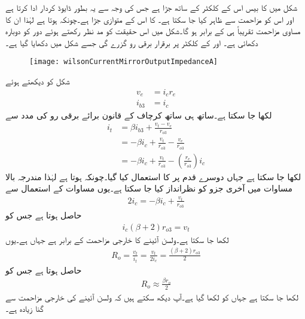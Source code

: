 شکل  میں  کا بیس اس کے کلکٹر کے ساتھ جڑا ہے جس  کی وجہ سے یہ بطور ڈایوڈ کردار ادا کرتا ہے اور اس کو مزاحمت  سے ظاہر کیا جا سکتا ہے۔ کا  اس  کے متوازی جڑا ہے۔چونکہ  ہوتا ہے لہٰذا ان کا مساوی مزاحمت تقریباً  ہی کے برابر ہو گا۔شکل  میں اس حقیقت کو مد نظر رکھتے ہوئے دور کو دوبارہ دکھائی ہے۔ اور  کے کلکٹر پر برقرار  برقی رو گزرے گی جسے شکل میں دکھایا گیا ہے۔
\begin{figure}
\centering
\texttt{[image: wilsonCurrentMirrorOutputImpedanceA]}
\caption{}
\label{شکل_تفرقی_ولسن_آئینے_کی_خارجی_مزاحمت_الف}
\end{figure}
شکل کو دیکھتے ہوئے
\begin{align*}
v_e&=i_c r_e\\
i_{b3}&=i_c
\end{align*}
لکھا جا سکتا ہے۔ساتھ ہی ساتھ کرچاف کے قانون برائے برقی رو کی مدد سے
\begin{align*}
i_t&=\beta i_{b3} +\frac{v_t-v_e}{r_{o3}}\\
&=-\beta i_c +\frac{v_t}{r_{o3}}-\frac{v_e}{r_{o3}}\\
&=-\beta i_c +\frac{v_t}{r_{o3}}-\left(\frac{r_e}{r_{o3}}\right) i_c
\end{align*}
لکھا جا سکتا ہے جہاں دوسرے قدم پر  کا استعمال کیا گیا۔چونکہ  ہوتا ہے لہٰذا مندرجہ بالا مساوات میں آخری جزو کو نظرانداز کیا جا سکتا ہے۔یوں مساوات  کے استعمال سے 
\begin{align*}
2 i_c=-\beta i_c +\frac{v_t}{r_{o3}}
\end{align*}
حاصل ہوتا ہے جس کو
\begin{align*}
i_c \left(\beta+2 \right) r_{o3}=v_t
\end{align*}
لکھا جا سکتا ہے۔ولسن آئینے کا خارجی مزاحمت  کے برابر ہے جہاں  ہے۔یوں
\begin{align}
R_o=\frac{v_t}{i_t}=\frac{v_t}{2 i_c}=\frac{\left(\beta+2 \right) r_{o3}}{2}
\end{align}
حاصل ہوتا ہے جس کو
\begin{align} \label{مساوات_تفرقی_ولسن_کی_خارجی_مزاحمت}
R_o \approx \frac{\beta r_{o}}{2}
\end{align}
لکھا جا سکتا ہے جہاں  کو  لکھا گیا ہے۔آپ دیکھ سکتے ہیں کہ ولسن آئینے کی خارجی مزاحمت  سے  گنا زیادہ ہے۔


